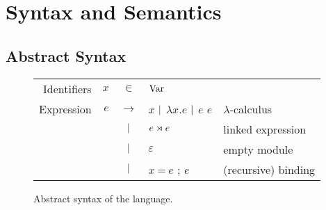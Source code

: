 \section{Syntax and Semantics}
\subsection{Abstract Syntax}
\begin{figure}[h!]
  \centering
  \small
  \begin{tabular}{rrcll}
    Identifiers & $x$ & $\in$         & $\textnormal{Var}$                                                      \\
    Expression  & $e$ & $\rightarrow$ & $x$ $|$ $\lambda x.e$ $|$ $e$ $e$ & $\lambda$-calculus  \\
                &     & $|$       & $e\rtimes e$                             & linked expression   \\
                &     & $|$       & $\varepsilon$                             & empty module        \\
                &     & $|$       & $x\:\texttt{=}\:e$ ; $e$                  & (recursive) binding
  \end{tabular}
  \caption{Abstract syntax of the language.}
  \label{fig:syntax}
\end{figure}
